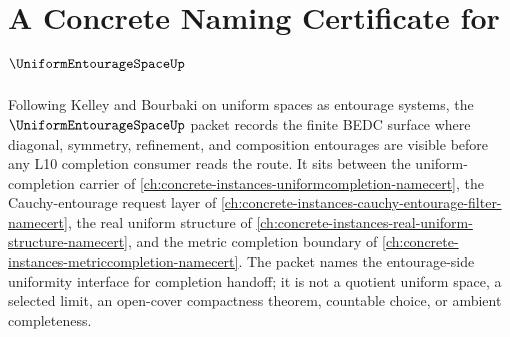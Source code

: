 \chapter{A Concrete Naming Certificate for $\UniformEntourageSpaceUp$}
\label{ch:concrete-instances-uniform-entourage-space-namecert}

Following Kelley and Bourbaki on uniform spaces as entourage systems, the $\UniformEntourageSpaceUp$ packet records the finite BEDC surface where diagonal, symmetry, refinement, and composition entourages are visible before any L10 completion consumer reads the route. It sits between the uniform-completion carrier of \autoref{ch:concrete-instances-uniformcompletion-namecert}, the Cauchy-entourage request layer of \autoref{ch:concrete-instances-cauchy-entourage-filter-namecert}, the real uniform structure of \autoref{ch:concrete-instances-real-uniform-structure-namecert}, and the metric completion boundary of \autoref{ch:concrete-instances-metriccompletion-namecert}. The packet names the entourage-side uniformity interface for completion handoff; it is not a quotient uniform space, a selected limit, an open-cover compactness theorem, countable choice, or ambient completeness.

